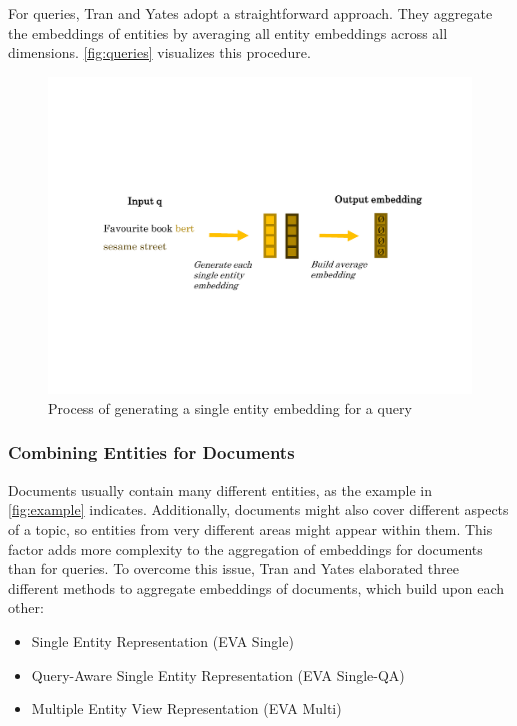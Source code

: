 For queries, Tran and Yates adopt a straightforward approach. They aggregate the embeddings of entities by averaging all entity embeddings across all dimensions. \autoref{fig:queries} visualizes this procedure.

\begin{figure}[!htb]
    \centering
    \includegraphics[trim={2cm 6cm 2cm 6cm}, clip, width=\textwidth]{resources/queries} 
    \caption{Process of generating a single entity embedding for a query}
    \label{fig:queries}
\end{figure}

\subsubsection{Combining Entities for Documents}\label{subsec:models}

Documents usually contain many different entities, as the example in \autoref{fig:example} indicates. Additionally, documents might also cover different aspects of a topic, so entities from very different areas might appear within them. This factor adds more complexity to the aggregation of embeddings for documents than for queries. To overcome this issue, Tran and Yates elaborated three different methods to aggregate embeddings of documents, which build upon each other:

\begin{itemize}
    \item Single Entity Representation (EVA Single)
    \item Query-Aware Single Entity Representation (EVA Single-QA)
    \item Multiple Entity View Representation (EVA Multi)
  \end{itemize}

